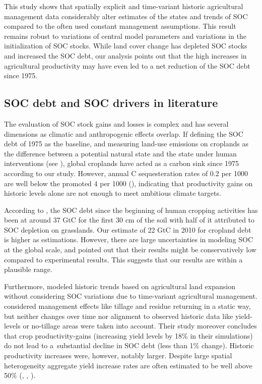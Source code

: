 \documentclass[gc, manuscript]{copernicus}
\begin{document}
This study shows that spatially explicit and time-variant historic agricultural management data considerably alter estimates of the states and trends of SOC compared to the often used constant management assumptions. This result remains robust to variations of central model parameters and variations in the initialization of SOC stocks. While land cover change has depleted SOC stocks and increased the SOC debt, our analysis points out that the high increases in agricultural productivity may have even led to a net reduction of the SOC debt since 1975.

\hypertarget{soc-debt-and-soc-drivers-in-literature}{%
\subsection{SOC debt and SOC drivers in literature}\label{soc-debt-and-soc-drivers-in-literature}}

The evaluation of SOC stock gains and losses is complex and has several dimensions as climatic and anthropogenic effects overlap. If defining the SOC debt of 1975 as the baseline, and measuring land-use emissions on croplands as the difference between a potential natural state and the state under human interventions (see \citep{pugh_simulated_2015}), global croplands have acted as a carbon sink since 1975 according to our study. However, annual C sequesteration rates of 0.2 per 1000 are well below the promoted 4 per 1000 (\citep{minasny_soil_2017}), indicating that productivity gains on historic levels alone are not enough to meet ambitious climate targets.

According to \citep{sanderman_soil_2017}, the SOC debt since the beginning of human cropping activities has been at around 37 GtC for the first 30 cm of the soil with half of it attributed to SOC depletion on grasslands. Our estimate of 22 GtC in 2010 for cropland debt is higher as \citep{sanderman_soil_2017} estimations. However, there are large uncertainties in modeling SOC at the global scale, and \citep{sanderman_soil_2017} pointed out that their results might be conservatively low compared to experimental results. This suggests that our results are within a plausible range.

Furthermore, \citep{sanderman_soil_2017} modeled historic trends based on agricultural land expansion without considering SOC variations due to time-variant agricultural management. \citep{pugh_simulated_2015} considered management effects like tillage and residue returning in a static way, but neither changes over time nor alignment to observed historic data like yield-levels or no-tillage areas were taken into account. Their study moreover concludes that crop productivity-gains (increasing yield levels by 18\% in their simulations) do not lead to a~substantial decline in SOC debt (less than 1\% change). Historic productivity increases were, however, notably larger. Despite large spatial heterogeneity aggregate yield increase rates are often estimated to be well above 50\% (\citep{pellegrini_crop_2018}, \citep{ray_recent_2012}, \citep{rudel_agricultural_2009}).
\end{document}

